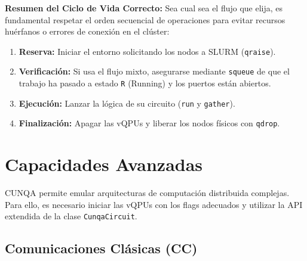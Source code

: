 \documentclass[a4paper,11pt]{article}
\begin{document}
\vspace{0.5cm}
\textbf{Resumen del Ciclo de Vida Correcto:}
Sea cual sea el flujo que elija, es fundamental respetar el orden secuencial de operaciones para evitar recursos huérfanos o errores de conexión en el clúster:

\begin{enumerate}
    \item \textbf{Reserva:} Iniciar el entorno solicitando los nodos a SLURM (\texttt{qraise}).
    \item \textbf{Verificación:} Si usa el flujo mixto, asegurarse mediante \texttt{squeue} de que el trabajo ha pasado a estado \texttt{R} (Running) y los puertos están abiertos.
    \item \textbf{Ejecución:} Lanzar la lógica de su circuito (\texttt{run} y \texttt{gather}).
    \item \textbf{Finalización:} Apagar las vQPUs y liberar los nodos físicos con \texttt{qdrop}.
\end{enumerate}

\section{Capacidades Avanzadas}

CUNQA permite emular arquitecturas de computación distribuida complejas. Para ello, es necesario iniciar las vQPUs con los flags adecuados y utilizar la API extendida de la clase \texttt{CunqaCircuit}.

\subsection{Comunicaciones Clásicas (CC)}
\end{document}
